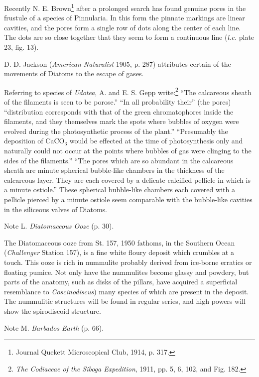 \documentclass[a4paper, 12pt, oneside]{article}
\begin{document}
Recently N. E. Brown\footnote{Journal Quekett Microscopical Club, 1914, p. 317.} after a prolonged search has found genuine pores in the frustule of a species of Pinnularia. In this form the pinnate markings are linear cavities, and the pores form a single row of dots along the center of each line. The dots are so close together that they seem to form a continuous line (\emph{l.c.} plate 23, fig. 13).

D. D. Jackson (\emph{American Naturalist} 1905, p. 287) attributes certain of the movements of Diatoms to the escape of gases.

Referring to species of \emph{Udotea}, A. and E. S. Gepp write:\footnote{\emph{The Codiaceae of the \emph{Siboga} Expedition}, 1911, pp. 5, 6, 102, and Fig. 182.} ``The calcareous sheath of the filaments is seen to be porose.'' ``In all probability their'' (the pores) ``distribution corresponds with that of the green chromatophores inside the filaments, and they themselves mark the spots where bubbles of oxygen were evolved during the photosynthetic process of the plant.'' ``Presumably the deposition of CaCO$_{3}$ would be effected at the time of photosynthesis only and naturally could not occur at the points where bubbles of gas were clinging to the sides of the filaments.'' ``The pores which are so abundant in the calcareous sheath are minute spherical bubble-like chambers in the thickness of the calcareous layer. They are each covered by a delicate calcified pellicle in which is a minute ostiole.'' These spherical bubble-like chambers each covered with a pellicle pierced by a minute ostiole seem comparable with the bubble-like cavities in the siliceous valves of Diatoms.

Note L. \emph{Diatomaceous Ooze} (p. 30).

The Diatomaceous ooze from St. 157, 1950 fathoms, in the Southern Ocean (\emph{Challenger} Station 157), is a fine white floury deposit which crumbles at a touch. This ooze is rich in nummulite probably derived from ice-borne erratics or floating pumice. Not only have the nummulites become glassy and powdery, but parts of the anatomy, such as disks of the pillars, have acquired a superficial resemblance to \emph{Coscinodiscus}) many species of which are present in the deposit. The nummulitic structures will be found in regular series, and high powers will show the spirodiscoid structure.

Note M. \emph{Barbados Earth} (p. 66).
\end{document}
